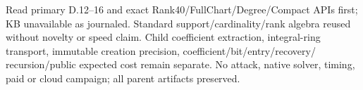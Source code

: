 \documentclass[10pt]{article}
\begin{document}
Read primary D.12--16 and exact Rank40/FullChart/Degree/Compact APIs first;
KB unavailable as journaled. Standard support/cardinality/rank algebra reused
without novelty or speed claim. Child coefficient extraction, integral-ring
transport, immutable creation precision, coefficient/bit/entry/recovery/
recursion/public expected cost remain separate. No attack, native solver,
timing, paid or cloud campaign; all parent artifacts preserved.
\end{document}
